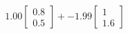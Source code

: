 \documentclass[preview]{standalone}
\begin{document}
\begin{align*}
1.00 \begin{bmatrix} 0.8 \\ 0.5 \end{bmatrix} + -1.99 \begin{bmatrix} 1 \\ 1.6 \end{bmatrix}
\end{align*}
\end{document}
